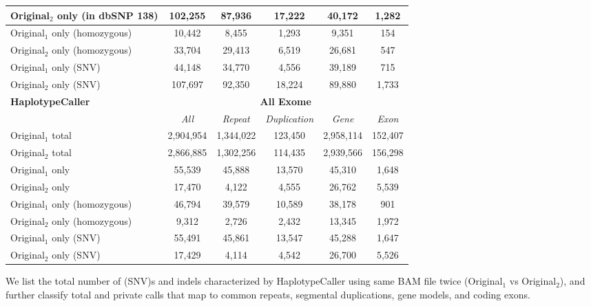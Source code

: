 \begin{table}[htb]
\begin{center}
\begin{tabular}{|l|c||c|c|c|c|}
\hline
Original$_2$ only (in dbSNP 138) & 102,255   & 87,936    & 17,222  & 40,172    & 1,282   \\
\hline
Original$_1$ only (homozygous) & 10,442    & 8,455     & 1,293   & 9,351     & 154     \\
\hline
Original$_2$ only (homozygous) & 33,704    & 29,413    & 6,519   & 26,681    & 547     \\
\hline
Original$_1$ only (SNV) & 44,148    & 34,770    & 4,556   & 39,189    & 715     \\
\hline
Original$_2$ only (SNV) & 107,697   & 92,350    & 18,224  & 89,880    & 1,733   \\
\hline
\hline
{\bf HaplotypeCaller} & \multicolumn{5}{|c|}{\bf All Exome} \\
\hline
\cline{2-6}
{\bf} & {\it All} & {\it Repeat} & {\it Duplication} & {\it Gene} & {\it Exon} \\
\hline
Original$_1$ total & 2,904,954 & 1,344,022 & 123,450 & 2,958,114 & 152,407 \\
\hline
Original$_2$ total & 2,866,885 & 1,302,256 & 114,435 & 2,939,566 & 156,298 \\
\hline
Original$_1$ only & 55,539    & 45,888    & 13,570   & 45,310    & 1,648     \\
\hline
Original$_2$ only & 17,470   & 4,122    & 4,555  & 26,762    & 5,539   \\
\hline
Original$_1$ only (homozygous) & 46,794    & 39,579     & 10,589   & 38,178     & 901     \\
\hline
Original$_2$ only (homozygous) & 9,312    & 2,726    & 2,432   & 13,345    & 1,972     \\
\hline
Original$_1$ only (SNV) & 55,491    & 45,861    & 13,547   & 45,288    & 1,647     \\
\hline
Original$_2$ only (SNV) & 17,429   & 4,114    & 4,542  & 26,700    & 5,526   \\
\hline
\end{tabular}
\end{center}
{\footnotesize We list the total number of (SNV)s and indels characterized by HaplotypeCaller using same BAM file twice (Original$_1$ vs Original$_2$), 
and further classify total and private calls that map to common repeats, segmental duplications, gene models, and coding exons.}
\label{supptab:orig-vs-orig2-hc}
\end{table}

